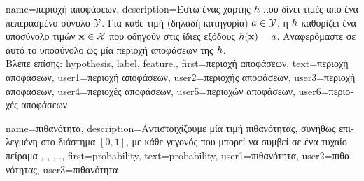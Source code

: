 {name={\foreignlanguage{greek}{περιοχή αποφάσεων}}, 
	description={\foreignlanguage{greek}{Έστω ένας χάρτης} 
		 $h$ \foreignlanguage{greek}{που δίνει τιμές από ένα πεπερασμένο σύνολο $\mathcal{Y}$. 
		Για κάθε τιμή}  \foreignlanguage{greek}{(δηλαδή κατηγορία) $a \in \mathcal{Y}$, η}  $h$ 
		\foreignlanguage{greek}{καθορίζει ένα υποσύνολο τιμών}  ${\bf x} \in \mathcal{X}$ \foreignlanguage{greek}{που  
		οδηγούν στις ίδιες εξόδους $h({\bf x})=a$. Αναφερόμαστε σε αυτό το υποσύνολο ως μία περιοχή αποφάσεων  
		της}  $h$.\\
		\foreignlanguage{greek}{Βλέπε επίσης:} \gls{hypothesis}, \gls{label}, \gls{feature}.},
		first={\foreignlanguage{greek}{περιοχή αποφάσεων}},
		text={\foreignlanguage{greek}{περιοχή αποφάσεων}},
		user1={\foreignlanguage{greek}{περιοχή αποφάσεων}}, %
		user2={\foreignlanguage{greek}{περιοχής αποφάσεων}}, %
		user3={\foreignlanguage{greek}{περιοχή αποφάσεων}}, %
		user4={\foreignlanguage{greek}{περιοχές αποφάσεων}}, %
		user5={\foreignlanguage{greek}{περιοχών αποφάσεων}}, %
		user6={\foreignlanguage{greek}{περιοχές αποφάσεων}} %
}

{name={\foreignlanguage{greek}{πιθανότητα}},
	description={\foreignlanguage{greek}{Αντιστοιχίζουμε} \foreignlanguage{greek}{μία τιμή 
		πιθανότητας, συνήθως επιλεγμένη στο διάστημα $[0,1]$, με κάθε γεγονός που μπορεί να συμβεί σε ένα τυχαίο 
		πείραμα} \cite{BillingsleyProbMeasure}, \cite{BertsekasProb}, \cite{HalmosMeasure}, \cite{KallenbergBook}.},
		first={probability},
		text={probability},
		user1={\foreignlanguage{greek}{πιθανότητα}}, %
    		user2={\foreignlanguage{greek}{πιθανότητας}}, %
		user3={\foreignlanguage{greek}{πιθανότητα}} %
}

